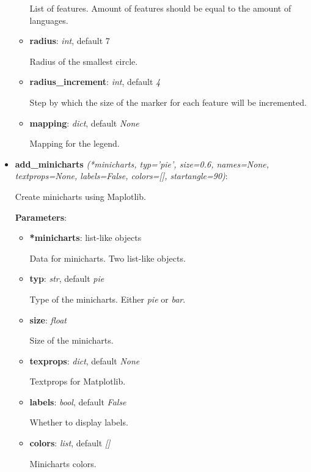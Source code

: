 \documentclass[a4paper,12pt]{article}
\begin{document}
\begin{itemize}
\begin{itemize}
 List of features. Amount of features should be equal to the amount of languages.
 
 \item \textbf{radius}: \textit{int}, default 7
 
 Radius of the smallest circle.
 
 \item \textbf {radius\_increment}: \textit{int}, default \textit{4}
 
 Step by which the size of the marker for each feature will be incremented.
 
 \item \textbf {mapping}: \textit{dict}, default \textit{None}
 
 Mapping for the legend.
 
 \end{itemize}
 
 \item \textbf{add\_minicharts} \textit{(*minicharts, typ='pie', size=0.6, names=None, textprops=None, labels=False, colors=[], startangle=90)}:
 
 Create minicharts using Maplotlib.
 
 \textbf{Parameters}:
 
 \begin{itemize}
 \item \textbf{*minicharts}: list-like objects
 
 Data for minicharts. Two list-like objects.
 
 \item \textbf{typ}: \textit{str}, default \textit{pie}
 
 Type of the minicharts. Either \textit{pie} or \textit{bar}.
 
 \item \textbf{size}: \textit{float}
 
 Size of the minicharts.
 
 \item \textbf{texprops}: \textit{dict}, default \textit{None}
 
 Textprops for Matplotlib.
 
 \item \textbf{labels}: \textit{bool}, default \textit{False}
 
 Whether to display labels.
 
 \item \textbf{colors}: \textit{list}, default \textit{[]}
 
 Minicharts colors.
 

\end{itemize}
\end{itemize}
\end{document}
